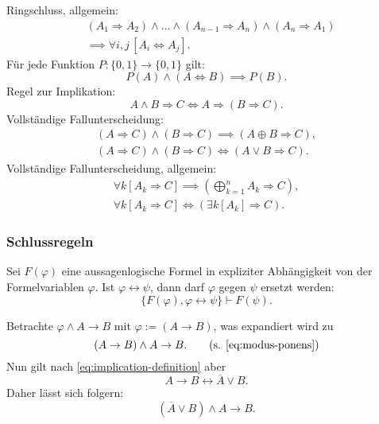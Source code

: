 Ringschluss, allgemein:
\begin{equation}
\begin{split}
& (A_1{\Rightarrow }A_2)\land\ldots\land(A_{n-1}{\Rightarrow}A_n)
\land(A_n{\Rightarrow}A_1)\\
& \implies \forall i,j\,[A_i\Leftrightarrow A_j].
\end{split}
\end{equation}
Für jede Funktion $P\colon\{0,1\}\to\{0,1\}$ gilt:
\begin{equation}
P(A)\land (A\Leftrightarrow B)\implies P(B).
\end{equation}
Regel zur Implikation:
\begin{equation}
A\land B\Rightarrow C \iff A\Rightarrow (B\Rightarrow C).
\end{equation}
Vollständige Fallunterscheidung:
\begin{gather}
(A\Rightarrow C)\land (B\Rightarrow C)\implies (A\oplus B\Rightarrow C),\\
(A\Rightarrow C)\land (B\Rightarrow C)\iff (A\lor B\Rightarrow C).
\end{gather}
Vollständige Fallunterscheidung, allgemein:
\begin{gather}
\textstyle \forall k[A_k\Rightarrow C]
\implies (\bigoplus_{k=1}^n A_k\Rightarrow C),\\
\forall k[A_k\Rightarrow C]
\iff (\exists k[A_k]\Rightarrow C).
\end{gather}

\subsubsection{Schlussregeln}
\begin{Satz}[Ersetzungsregel]
Sei $F(\varphi)$ eine aussagenlogische
Formel in expliziter Abhängigkeit von der Formelvariablen $\varphi$.
Ist $\varphi\leftrightarrow\psi$, dann darf $\varphi$ gegen $\psi$
ersetzt werden:
\begin{equation}
\{F(\varphi),\varphi\leftrightarrow\psi\}\vdash F(\psi).
\end{equation}
\end{Satz}

\newpage\noindent
{} Betrachte $\varphi\land A\rightarrow B$ mit
$\varphi:=(A\rightarrow B)$, was expandiert wird zu
\[(A\rightarrow B)\land A\rightarrow B.\qquad\text{(s. \eqref{eq:modus-ponens})}\]
Nun gilt nach \eqref{eq:implication-definition} aber
\[A\rightarrow B\leftrightarrow \overline A\lor B.\]
Daher lässt sich folgern:
\[(\overline A\lor B)\land A\rightarrow B.\]

